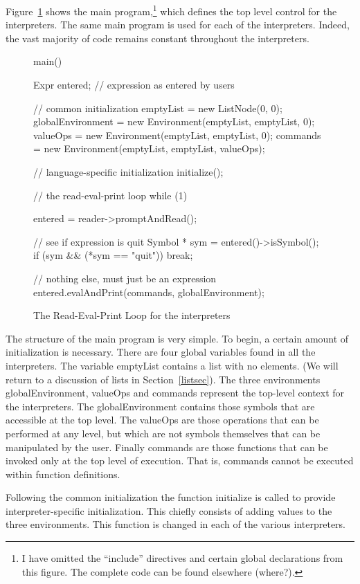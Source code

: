 Figure~\ref{main} shows the main program,\footnote{I have omitted the
``include'' directives and certain global declarations from this figure.
The complete code can be found elsewhere (where?).}
which defines the top level
control for the interpreters.  The same main program is used for each of
the interpreters.  Indeed, the vast majority of code remains constant
throughout the interpreters.

\begin{figure}
\begin{cprog}
main() {
	Expr entered;	// expression as entered by users

	// common initialization
	emptyList = new ListNode(0, 0);
	globalEnvironment = new Environment(emptyList, emptyList, 0);
	valueOps = new Environment(emptyList, emptyList, 0);
	commands = new Environment(emptyList, emptyList, valueOps);

	// language-specific initialization
	initialize();

	// the read-eval-print loop
	while (1) {
		entered = reader->promptAndRead();

		// see if expression is quit
		Symbol * sym = entered()->isSymbol();
		if (sym && (*sym == "quit"))
			break;

		// nothing else, must just be an expression
		entered.evalAndPrint(commands, globalEnvironment);
		}
}
\end{cprog}
\caption{The Read-Eval-Print Loop for the interpreters}\label{main}
\end{figure}

The structure of the main program is very simple.
To begin, a certain amount of initialization is necessary.  There are four
global variables found in all the interpreters.  The variable
{\sf emptyList} contains a list with no elements.  (We will return to a
discussion of lists in Section~\ref{listsec}).
The three environments {\sf globalEnvironment}, {\sf valueOps} and {\sf
commands} represent the top-level context for the interpreters.
The {\sf globalEnvironment} contains those symbols that are accessible at
the top level.  The {\sf valueOps} are those operations that can be
performed at any level, but which are not symbols themselves that can be
manipulated by the user.  Finally {\sf commands} are those functions that
can be invoked only at the top level of execution.  That is, commands
cannot be executed within function definitions.

Following the common initialization the function {\sf initialize} is called
to provide interpreter-specific initialization.  This chiefly consists of
adding values to the three environments.  This function is changed 
in each of the various interpreters.

